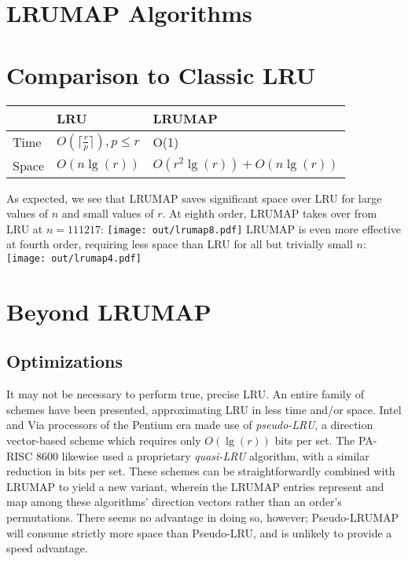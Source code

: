 \documentclass[letterpaper,10pt]{article}
\makeatletter
\newenvironment{figurehere}
{\def\@captype{figure}}
{}
\makeatother
\begin{document}
\begin{multicols}{2}
\section{LRUMAP Algorithms}
\section{Comparison to Classic LRU}
\begin{center}
\begin{tabular}{|l|l|l|}
\hline
 & LRU & LRUMAP \\
\hline
Time & $O(\lceil\frac{r}{p}\rceil), {p}\le{r}$ & O(1) \\
\hline
Space & $O(n\lg{(r)})$ & $O(r^{2}\lg{(r)}) + O(n\lg{(r)})$ \\
\hline
\end{tabular}
\end{center}
As expected, we see that LRUMAP saves significant space over LRU for large
values of $n$ and small values of $r$. At eighth order, LRUMAP takes over
from LRU at $n=111217$:
\begin{figurehere}
	\centering
	\texttt{[image: out/lrumap8.pdf]}
\end{figurehere}
LRUMAP is even more effective at fourth order, requiring less space than LRU
for all but trivially small $n$:
\begin{figurehere}
	\centering
	\texttt{[image: out/lrumap4.pdf]}
\end{figurehere}
\section{Beyond LRUMAP}
\subsection{Optimizations}
It may not be necessary to perform true, precise LRU. An entire family of
schemes have been presented, approximating LRU in less time and/or space.
Intel\cite{shanley} and Via processors of the Pentium era made use of
\textit{pseudo-LRU}, a direction vector-based scheme which requires only
$O(\lg{(r)})$ bits per set\cite{handy}. The PA-RISC 8600\cite{hurd} likewise used
a proprietary \textit{quasi-LRU} algorithm, with a similar reduction in bits
per set. These schemes can be straightforwardly combined with LRUMAP to yield a
new variant, wherein the LRUMAP entries represent and map among these
algorithms' direction vectors rather than an order's permutations. There seems
no advantage in doing so, however; Pseudo-LRUMAP will consume strictly more space
than Pseudo-LRU, and is unlikely to provide a speed advantage.


\end{multicols}
\end{document}
